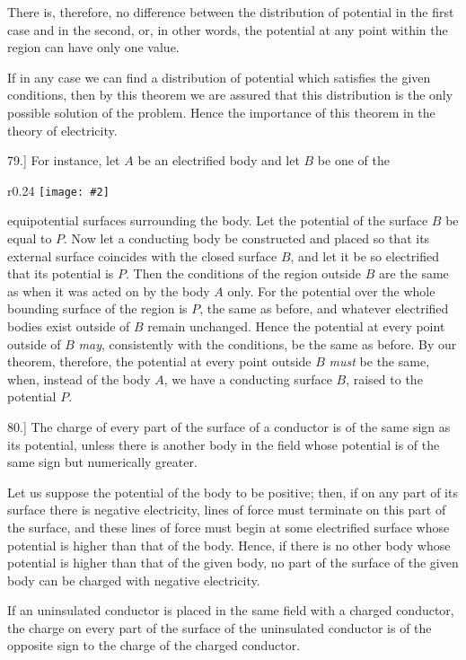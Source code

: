 \documentclass[12pt,oneside]{book}[2021/10/04]
\newcommand{\Runhead}[1]{\fancyhead[C]{\iffloatpage{}{\small#1}}}
\newcommand{\article}[1]{\phantomsection \label{art:#1}{#1.]}}
\newcommand{\wrapfig}[3]{
\begin{wrapfigure}{r}{#1\textwidth}
\centering
\texttt{[image: \#2]}
\caption*{\small #3}
\end{wrapfigure}}
\newcommand{\¬}{\hphantom{0}}
\begin{document}
There is, therefore, no difference between the distribution of
potential in the first case and in the second, or, in other words,
the potential at any point within the region can have only one
value.

If in any case we can find a distribution of potential which
satisfies the given conditions, then by this theorem we are assured
that this distribution is the only possible solution of the problem.
Hence the importance of this theorem in the theory of electricity.
\Runhead{THOMSON'S THEOREM.}

\article{79} For instance, let \(A\) be an electrified body and let \(B\) be
one of the
\wrapfig{0.24}{075.png}{Fig. 18.}
equipotential surfaces surrounding the body. Let the
potential of the surface \(B\) be equal to \(P\). Now
let a conducting body be constructed and placed
so that its external surface coincides with the
closed surface \(B\), and let it be so electrified that
its potential is \(P\). Then the conditions of the
region outside \(B\) are the same as when it was
acted on by the body \(A\) only. For the potential
over the whole bounding surface of the region is \(P\), the same as
before, and whatever electrified bodies exist outside of \(B\) remain
unchanged. Hence the potential at every point outside of \(B\) \textit{may},
consistently with the conditions, be the same as before. By our
theorem, therefore, the potential at every point outside \(B\) \textit{must} be
the same, when, instead of the body \(A\), we have a conducting
surface \(B\), raised to the potential \(P\).

\article{80} The charge of every part of the surface of a conductor is
of the same sign as its potential, unless there is another body
in the field whose potential is of the same sign but numerically
greater.

Let us suppose the potential of the body to be positive; then,
if on any part of its surface there is negative electricity, lines of
force must terminate on this part of the surface, and these lines
of force must begin at some electrified surface whose potential is
higher than that of the body. Hence, if there is no other body
whose potential is higher than that of the given body, no part
of the surface of the given body can be charged with negative
electricity.

If an uninsulated conductor is placed in the same field with a
charged conductor, the charge on every part of the surface of
the uninsulated conductor is of the opposite sign to the charge of
the charged conductor.
\end{document}
